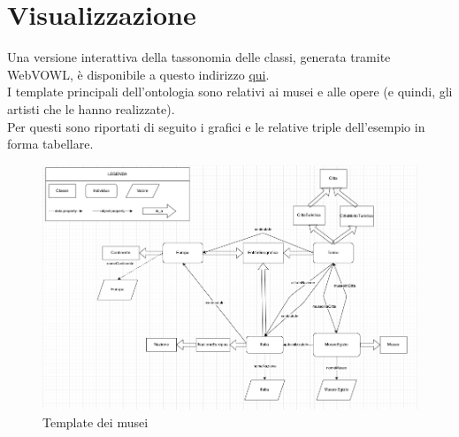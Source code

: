 \documentclass[12pt]{article}
\begin{document}
\section{Visualizzazione}
Una versione interattiva della tassonomia delle classi, generata tramite WebVOWL, è disponibile a questo indirizzo \href{http://www.visualdataweb.de/webvowl/#iri=https://raw.githubusercontent.com/ModSem20-21/MuseumOntology/master/Ontologia/MuseumInformator.ttl}{qui}.\\
I template principali dell'ontologia sono relativi ai musei e alle opere (e quindi, gli artisti che le hanno realizzate).\\
Per questi sono riportati di seguito i grafici e le relative triple dell'esempio in forma tabellare.


\begin{figure}[H]
   \includegraphics[scale=0.48]{fig/template Museo.png}
   \caption{Template dei musei}\label{fig:picture}
\end{figure}
\end{document}
